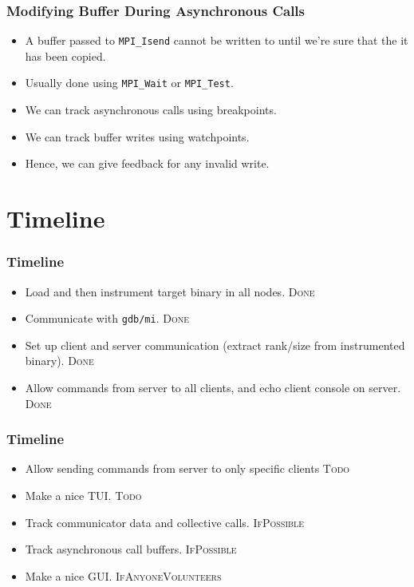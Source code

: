 \documentclass{beamer}
\begin{document}
\begin{frame}
  \frametitle{Modifying Buffer During Asynchronous Calls}
 \begin{itemize}
 \item <1-> A buffer passed to \texttt{MPI\_Isend} cannot be written to until we're sure that the it has been copied.
 \item <2-> Usually done using \texttt{MPI\_Wait} or \texttt{MPI\_Test}.
 \item <3-> We can track asynchronous calls using breakpoints.
 \item <4-> We can track buffer writes using watchpoints.
 \item <5-> Hence, we can give feedback for any invalid write.
 \end{itemize}
\end{frame}

\section{Timeline}
\begin{frame}
  \frametitle{Timeline}
  \begin{itemize}
  \item <1-> Load and then instrument target binary in all nodes. \textsc{Done}
  \item <2-> Communicate with \texttt{gdb/mi}. \textsc{Done}
  \item <3-> Set up client and server communication (extract rank/size from instrumented binary). \textsc{Done}
  \item <4-> Allow commands from server to all clients, and echo client console on server. \textsc{Done}
  \end{itemize}
\end{frame}

\begin{frame}
  \frametitle{Timeline}
  \begin{itemize}
  \item <1-> Allow sending commands from server to only specific clients \textsc{Todo}
  \item <2-> Make a nice TUI. \textsc{Todo}
  \item <3-> Track communicator data and collective calls. \textsc{IfPossible}
  \item <4-> Track asynchronous call buffers. \textsc{IfPossible}
  \item <4-> Make a nice GUI. \textsc{IfAnyoneVolunteers}
  \end{itemize}
\end{frame}
\end{document}
